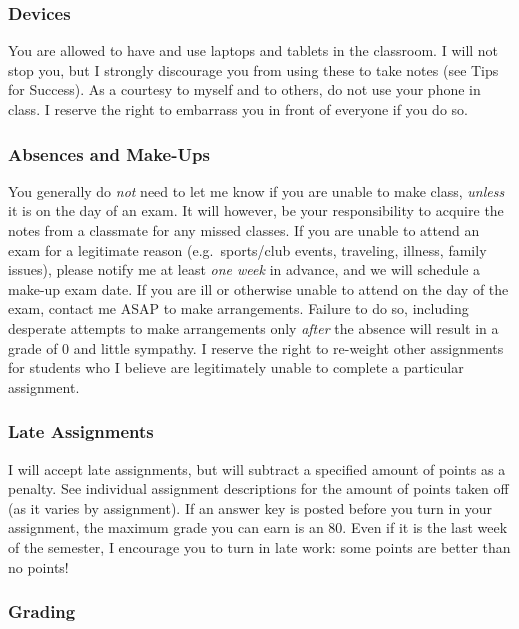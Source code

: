 \documentclass{article}
\begin{document}
\hypertarget{devices}{%
\subsubsection{Devices}\label{devices}}

You are allowed to have and use laptops and tablets in the classroom. I
will not stop you, but I strongly discourage you from using these to
take notes (see Tips for Success). As a courtesy to myself and to
others, do not use your phone in class. I reserve the right to embarrass
you in front of everyone if you do so.

\hypertarget{absences-and-make-ups}{%
\subsubsection{Absences and Make-Ups}\label{absences-and-make-ups}}

You generally do \emph{not} need to let me know if you are unable to
make class, \emph{unless} it is on the day of an exam. It will however,
be your responsibility to acquire the notes from a classmate for any
missed classes. If you are unable to attend an exam for a legitimate
reason (e.g.~sports/club events, traveling, illness, family issues),
please notify me at least \emph{one week} in advance, and we will
schedule a make-up exam date. If you are ill or otherwise unable to
attend on the day of the exam, contact me ASAP to make arrangements.
Failure to do so, including desperate attempts to make arrangements only
\emph{after} the absence will result in a grade of 0 and little
sympathy. I reserve the right to re-weight other assignments for
students who I believe are legitimately unable to complete a particular
assignment.

\hypertarget{late-assignments}{%
\subsubsection{Late Assignments}\label{late-assignments}}

I will accept late assignments, but will subtract a specified amount of
points as a penalty. See individual assignment descriptions for the
amount of points taken off (as it varies by assignment). If an answer
key is posted before you turn in your assignment, the maximum grade you
can earn is an 80. Even if it is the last week of the semester, I
encourage you to turn in late work: some points are better than no
points!

\hypertarget{grading}{%
\subsubsection{Grading}\label{grading}}
\end{document}
